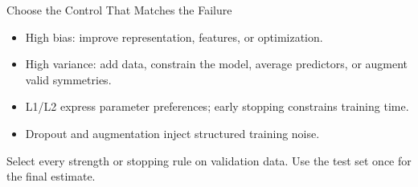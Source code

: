\documentclass{ntuabeamer}
\begin{document}
\begin{frame}{Choose the Control That Matches the Failure}
  \begin{itemize}
    \item High bias: improve representation, features, or optimization.
    \item High variance: add data, constrain the model, average predictors, or augment valid symmetries.
    \item L1/L2 express parameter preferences; early stopping constrains training time.
    \item Dropout and augmentation inject structured training noise.
  \end{itemize}
  Select every strength or stopping rule on validation data. Use the test set once for the final estimate.
\end{frame}
\end{document}
